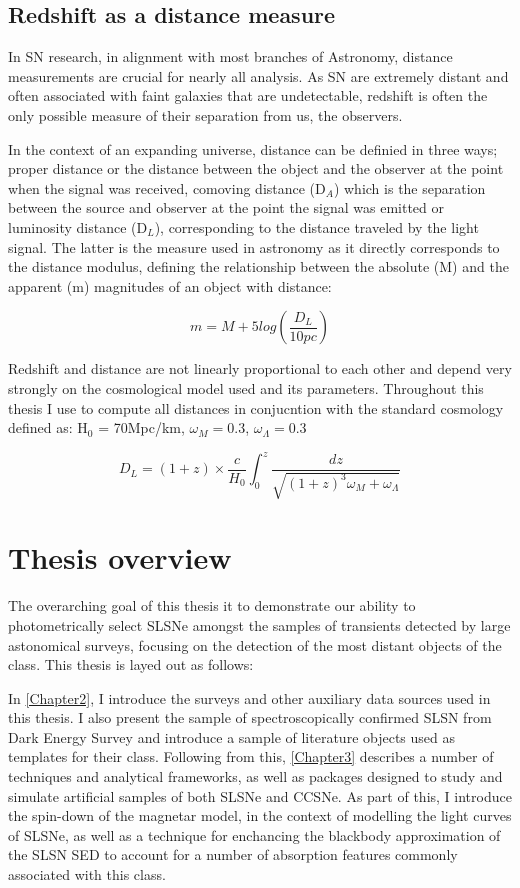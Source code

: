 \subsection{Redshift as a distance measure}
In SN research, in alignment with most branches of Astronomy, distance measurements are crucial for nearly all analysis. As SN are extremely distant and often associated with faint galaxies that are undetectable, redshift is often the only possible measure of their separation from us, the observers.

In the context of an expanding universe, distance can be definied in three ways; proper distance or the distance between the object and the observer at the point when the signal was received, comoving distance (D$_A$) which is the separation between the source and observer at the point the signal was emitted or luminosity distance (D$_L$), corresponding to the distance traveled by the light signal. The latter is the measure used in astronomy as it directly corresponds to the distance modulus, defining the relationship between the absolute (M) and the apparent (m) magnitudes of an object with distance:

\begin{equation}
  m = M + 5log(\frac{D_L}{10pc})
\end{equation}

Redshift and distance are not linearly proportional to each other and depend very strongly on the cosmological model used and its parameters. Throughout this thesis I use  to compute all distances in conjucntion with the standard cosmology defined as: H$_0$ = 70Mpc/km, $\omega_M = 0.3$, $\omega_{\Lambda} = 0.3$ 

\begin{equation} \label{eq:LumDist}
  D_L = (1+z) \times \frac{c}{H_0} \int^{z}_{0} \frac{dz}{\sqrt{(1+z)^3 \omega_M + \omega_{\Lambda}}}
\end{equation}

\section{Thesis overview}
The overarching goal of this thesis it to demonstrate our ability to photometrically select SLSNe amongst the samples of transients detected by large astonomical surveys, focusing on the detection of the most distant objects of the class. This thesis is layed out as follows:

In \cref{Chapter2}, I introduce the surveys and other auxiliary data sources used in this thesis. I also present the sample of spectroscopically confirmed SLSN from Dark Energy Survey and introduce a sample of literature objects used as templates for their class. Following from this, \cref{Chapter3} describes a number of techniques and analytical frameworks, as well as packages designed to study and simulate artificial samples of both SLSNe and CCSNe. As part of this, I introduce the spin-down of the magnetar model, in the context of modelling the light curves of SLSNe, as well as a technique for enchancing the blackbody approximation of the SLSN SED to account for a number of absorption features commonly associated with this class.


